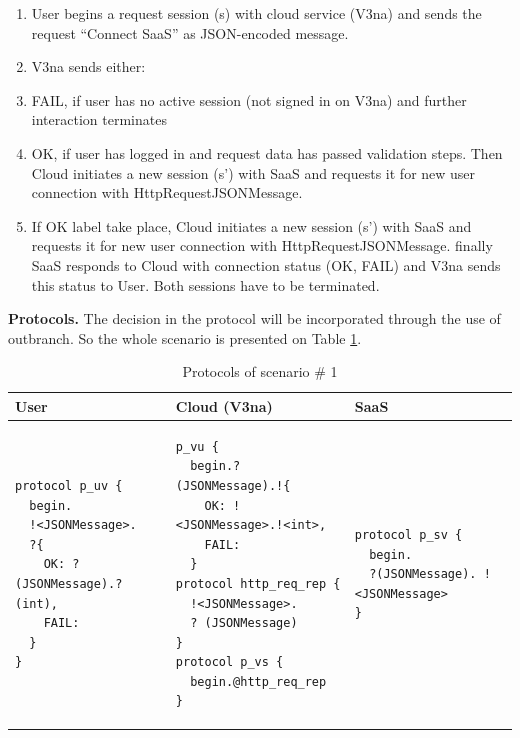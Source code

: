 \begin{enumerate}
\item  User begins a request session (s) with cloud service (V3na) and sends the request ``Connect SaaS'' as JSON-encoded message.

\item  V3na sends either:

\item  FAIL, if user has no active session (not signed in on V3na) and further interaction terminates 

\item  OK, if user has logged in and request data has passed validation steps. Then Cloud initiates a new session (s') with SaaS and requests it for new user connection with HttpRequestJSONMessage.

\item  If OK label take place, Cloud initiates a new session (s') with SaaS and requests it for new user connection with HttpRequestJSONMessage. finally SaaS responds to Cloud with connection status (OK, FAIL) and V3na sends this status to User. Both sessions have to be terminated.
\end{enumerate}

\textbf{Protocols.} The decision in the protocol will be incorporated through the use of outbranch. So the whole scenario is presented on Table \ref{tab:protocols-sc1}.

{\lstset{
framerule=0pt,
numbers=none
}
\begin{longtable}{|p{}|p{}|p{}|}
\caption{Protocols of scenario \# 1}
\label{tab:protocols-sc1} \\ \hline
\textbf{User} & \textbf{Cloud (V3na)} & \textbf{SaaS} \\ \hline
\endhead

\begin{lstlisting}
protocol p_uv { 
  begin.
  !<JSONMessage>. 
  ?{
    OK: ?(JSONMessage).?(int),
    FAIL: 
  }
}
\end{lstlisting}
&
\begin{lstlisting}
p_vu { 
  begin.?(JSONMessage).!{
    OK: !<JSONMessage>.!<int>,
    FAIL: 
  }
protocol http_req_rep {
  !<JSONMessage>.
  ? (JSONMessage)
}
protocol p_vs { 
  begin.@http_req_rep 
}
\end{lstlisting}
&
\begin{lstlisting}
protocol p_sv { 
  begin.
  ?(JSONMessage). !<JSONMessage> 
}
\end{lstlisting}
\\ \hline
\end{longtable}
}

